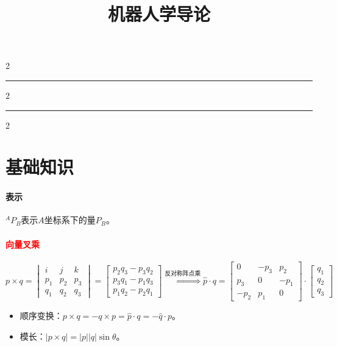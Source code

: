 \documentclass[
12pt, %
a4paper, 
oneside, %
]{scrartcl}
\title{机器人学导论}
\date{}
\begin{document}
\maketitle
\newpage
\hypertarget{toc}{}
\begingroup
\begin{multicols}{2}
\tableofcontents
\end{multicols}
\endgroup
\hrule
\begingroup
\begin{multicols}{2}
\listoffigures
\end{multicols}
\endgroup
\hrule
\begingroup
\begin{multicols}{2}
\listoftables
\end{multicols}
\endgroup
\newpage
\listoftips
\newpage
\section{基础知识}
\paragraph{表示}
$ {}^A P_B $表示$ A $坐标系下的量$ P_B $。
\paragraph{\textcolor{red}{向量叉乘}}
$$ p \times q = \begin{vmatrix} i & j & k \\ p_1 & p_2 & p_3 \\ q_1 & q_2 & q_3 \end{vmatrix} = \begin{bmatrix} p_2 q_3 - p_3 q_2 \\ p_3 q_1 - p_1 q_3 \\ p_1 q_2 - p_2 q_1 \end{bmatrix} \overset{\text{反对称阵点乘}}{\Longrightarrow} \hat{p} \cdot q = \begin{bmatrix} 0 & -p_3 & p_2 \\ p_3 & 0 & -p_1 \\ -p_2 & p_1 & 0 \end{bmatrix} \cdot \begin{bmatrix} q_1 \\ q_2 \\ q_3 \end{bmatrix} $$

\begin{itemize}
\item 顺序变换：$ p \times q = -q \times p = \hat{p} \cdot q = -\hat{q} \cdot p $。
\item 模长：$ |p \times q| = |p||q|\sin\theta $。
\end{itemize}
\end{document}
